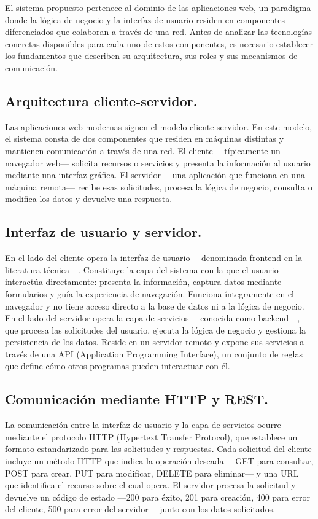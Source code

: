 El sistema propuesto pertenece al dominio de las aplicaciones web, un paradigma donde la lógica de negocio y la interfaz de usuario residen en componentes diferenciados que colaboran a través de una red. 
Antes de analizar las tecnologías concretas disponibles para cada uno de estos componentes, es necesario establecer los fundamentos que describen su arquitectura, sus roles y sus mecanismos de comunicación.

\subsection{Arquitectura cliente-servidor.}

Las aplicaciones web modernas siguen el modelo cliente-servidor. 
En este modelo, el sistema consta de dos componentes que residen en máquinas distintas y mantienen comunicación a través de una red. 
El cliente —típicamente un navegador web— solicita recursos o servicios y presenta la información al usuario mediante una interfaz gráfica. 
El servidor —una aplicación que funciona en una máquina remota— recibe esas solicitudes, procesa la lógica de negocio, consulta o modifica los datos y devuelve una respuesta. 

\subsection{Interfaz de usuario y servidor.}

En el lado del cliente opera la interfaz de usuario —denominada frontend en la literatura técnica—. 
Constituye la capa del sistema con la que el usuario interactúa directamente: presenta la información, captura datos mediante formularios y guía la experiencia de navegación. 
Funciona íntegramente en el navegador y no tiene acceso directo a la base de datos ni a la lógica de negocio. 
En el lado del servidor opera la capa de servicios —conocida como backend—, que procesa las solicitudes del usuario, ejecuta la lógica de negocio y gestiona la persistencia de los datos. 
Reside en un servidor remoto y expone sus servicios a través de una API (Application Programming Interface), un conjunto de reglas que define cómo otros programas pueden interactuar con él.

\subsection{Comunicación mediante HTTP y REST.}

La comunicación entre la interfaz de usuario y la capa de servicios ocurre mediante el protocolo HTTP (Hypertext Transfer Protocol), que establece un formato estandarizado para las solicitudes y respuestas. 
Cada solicitud del cliente incluye un método HTTP que indica la operación deseada —GET para consultar, POST para crear, PUT para modificar, DELETE para eliminar— y una URL que identifica el recurso sobre el cual opera. 
El servidor procesa la solicitud y devuelve un código de estado —200 para éxito, 201 para creación, 400 para error del cliente, 500 para error del servidor— junto con los datos solicitados.


